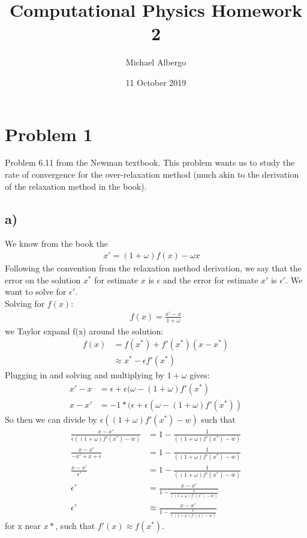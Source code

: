 \documentclass{article}
\title{Computational Physics Homework 2}
\author{Michael Albergo}
\date{11 October 2019}
\begin{document}
\maketitle

\section{Problem 1}
Problem 6.11 from the Newman textbook. This problem wants us to study the rate of convergence for the over-relaxation method (much akin to the derivation of the relaxation method in the book). 

\subsection*{a)}
We know from the book the \begin{align}
    x' = (1 + \omega)f(x) - \omega x \quad 
\end{align}
Following the convention from the relaxation method derivation, we say that the error on the solution $x^*$ for estimate $x$ is $\epsilon$ and the error for estimate $x'$ is $\epsilon'$. We want to solve for $\epsilon'$. \\

Solving for $f(x)$:
\begin{align}
    f(x) = \frac{x' - x}{1 +\omega}
\end{align}
we Taylor expand f(x) around the solution:
\begin{align}
    f(x) &= f(x^*) + f'(x^*)(x - x^*) \\
    &\approx x^* - \epsilon f'(x^*)
\end{align}
Plugging in and solving and multiplying by $1 + \omega$ gives:
\begin{align}
    x' - x &= \epsilon + \epsilon(\omega - (1+\omega) f'(x^*) \\
    x - x' &= -1* (\epsilon + \epsilon(\omega - (1+\omega) f'(x^*))
\end{align}
So then we can divide by $\epsilon((1+\omega)f'(x^*) - w)$ such that
\begin{align}
    \frac{x - x'}{\epsilon((1+\omega)f'(x^*) - w)} &= 1 - \frac{1}{((1+\omega)f'(x^*) -w)} \\
    \frac{x -  x'}{-x'  + x + \epsilon} &= 1 - \frac{1}{((1+\omega)f'(x^*) -w)} \\
    \frac{x -  x'}{\epsilon'} &= 1 - \frac{1}{((1+\omega)f'(x^*) -w)} \\
    \epsilon' &= \frac{x - x'}{1 - \frac{1}{((1+\omega)f'(x^*) -w)}} \\
    \epsilon' &\approx \frac{x - x'}{1 - \frac{1}{((1+\omega)f'(x) -w)}}
\end{align}
for x near $x*$, such that $f'(x) \approx f(x^*)$. 
\end{document}
